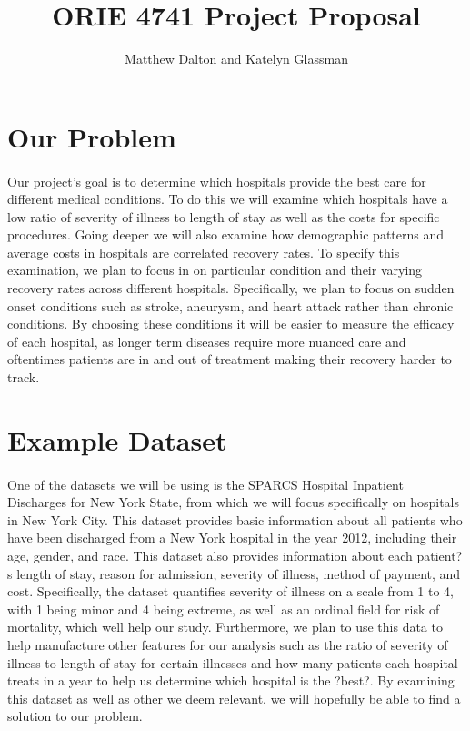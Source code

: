 \documentclass{article}
\title{ORIE 4741 Project Proposal}
\author{Matthew Dalton and Katelyn Glassman}
\begin{document}
\maketitle
 
 \section{Our Problem}
 
 \paragraph{}

Our project's goal is to determine which hospitals provide the best care for different medical conditions. To do this we will examine which hospitals have a low ratio of severity of illness to length of stay as well as the costs for specific procedures. Going deeper we will also examine how demographic patterns and average costs in hospitals are correlated recovery rates. To specify this examination, we plan to focus in on particular condition and their varying recovery rates across different hospitals. Specifically, we plan to focus on sudden onset conditions such as stroke, aneurysm, and heart attack rather than chronic conditions.  By choosing these conditions it will be easier to measure the efficacy of each hospital, as longer term diseases require more nuanced care and oftentimes patients are in and out of treatment making their recovery harder to track. 

 \section{Example Dataset}
 
 \paragraph{} 
 
One of the datasets we will be using is the SPARCS Hospital Inpatient Discharges for New York State, from which we will focus specifically on hospitals in New York City. This dataset provides basic information about all patients who have been discharged from a New York hospital in the year 2012, including their age, gender, and race. This dataset also provides information about each patient?s length of stay, reason for admission, severity of illness, method of payment, and cost.  Specifically, the dataset quantifies severity of illness on a scale from 1 to 4, with 1 being minor and 4 being extreme, as well as an ordinal field for risk of mortality, which well help our study.  Furthermore, we plan to use this data to help manufacture other features for our analysis such as the ratio of severity of illness to length of stay for certain illnesses and how many patients each hospital treats in a year to help us determine which hospital is the ?best?. By examining this dataset as well as other we deem relevant, we will hopefully be able to find a solution to our problem.
\end{document}
